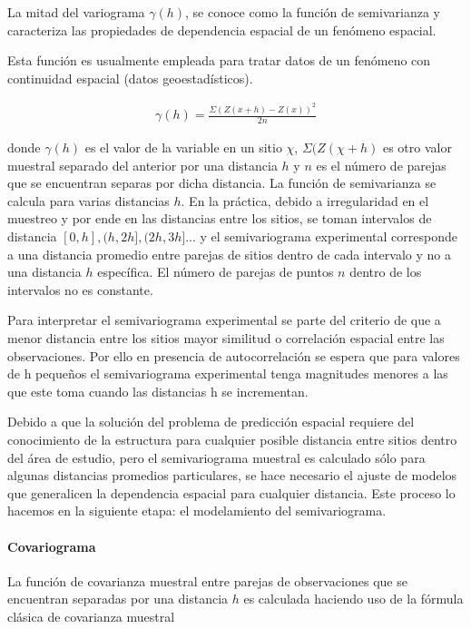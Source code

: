 La mitad del variograma $\gamma(h)$, se conoce como la función de semivarianza y caracteriza las propiedades de dependencia espacial de un fenómeno espacial. 

Esta función es usualmente empleada para tratar datos de un fenómeno con continuidad espacial (datos geoestadísticos). 


\begin{equation*}
\begin{aligned}
   \gamma(h)  = \frac{\Sigma(Z(x + h) - Z(x))^2}{2n}
\end{aligned}
\end{equation*}


donde $\gamma(h) $ es el valor de la variable en un sitio $\chi$, $\Sigma(Z(\chi + h) $ es otro valor muestral separado del anterior por una distancia $h$ y $n$ es el número de parejas que se encuentran separas por dicha distancia. La función de semivarianza se calcula para varias distancias $h$. En la práctica, debido a irregularidad en el muestreo y por ende en las distancias entre los sitios, se toman intervalos de distancia $[0,h], (h,2h], (2h, 3h]$... y el semivariograma experimental corresponde a una distancia promedio entre parejas de sitios dentro de cada intervalo y no a una distancia $h$ específica. El número de parejas de puntos $n$ dentro de los intervalos no es constante.

Para interpretar el semivariograma experimental se parte del criterio de que a menor distancia entre los sitios mayor similitud o correlación espacial entre las observaciones. Por ello en presencia de autocorrelación se espera que para valores de h pequeños el semivariograma experimental tenga magnitudes menores a las que este toma cuando las distancias h se incrementan.

Debido a que la solución del problema de predicción espacial requiere del conocimiento de la estructura para cualquier posible distancia entre sitios dentro del área de estudio, pero el semivariograma muestral es calculado sólo para algunas distancias promedios particulares, se hace necesario el ajuste de modelos que generalicen la dependencia espacial para cualquier distancia. Este proceso lo hacemos en la siguiente etapa: el modelamiento del semivariograma. 




\paragraph{Covariograma}
La función de covarianza muestral entre parejas de observaciones que se encuentran separadas por
una distancia $h$ es calculada haciendo uso de la fórmula clásica de covarianza muestral 

